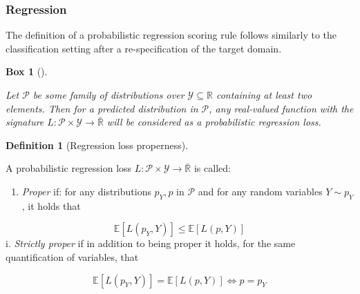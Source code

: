 \documentclass[
  letterpaper,
]{scrbook}
\providecommand{\tightlist}{%
  \setlength{\itemsep}{0pt}\setlength{\parskip}{0pt}}\usepackage{longtable,booktabs,array}
\theoremstyle{plain}
\newtheorem{conjecture}{Box}[chapter]
\theoremstyle{definition}
\newtheorem{definition}{Definition}[chapter]
\theoremstyle{remark}
\begin{document}
\hypertarget{sec-eval-distr-score-reg-reg}{%
\subsubsection{Regression}\label{sec-eval-distr-score-reg-reg}}

The definition of a probabilistic regression scoring rule follows
similarly to the classification setting after a re-specification of the
target domain.

\begin{tcolorbox}[enhanced jigsaw, title={Probabilistic regression loss}, breakable, leftrule=.75mm, rightrule=.15mm, opacityback=0, coltitle=black, colback=white, toptitle=1mm, toprule=.15mm, bottomtitle=1mm, titlerule=0mm, arc=.35mm, bottomrule=.15mm, colbacktitle=quarto-callout-note-color!10!white, left=2mm, opacitybacktitle=0.6, colframe=quarto-callout-note-color-frame]

\leavevmode{}%
\begin{conjecture}[]\label{cnj-loss-regr}

Let \(\mathcal{P}\) be some family of distributions over
\(\mathcal{Y}\subseteq \mathbb{R}\) containing at least two elements.
Then for a predicted distribution in \(\mathcal{P}\), any real-valued
function with the signature
\(L: \mathcal{P}\times \mathcal{Y}\rightarrow \bar{\mathbb{R}}\) will be
considered as a \emph{probabilistic regression loss}.

\end{conjecture}

\end{tcolorbox}

\leavevmode{}%
\begin{definition}[Regression loss properness]\label{def-regr-proper}

A probabilistic regression loss
\(L: \mathcal{P}\times \mathcal{Y}\rightarrow \bar{\mathbb{R}}\) is
called:

\begin{enumerate}
\def\labelenumi{\roman{enumi}.}
\tightlist
\item
  \emph{Proper} if: for any distributions \(p_Y,p\) in \(\mathcal{P}\)
  and for any random variables \(Y \sim p_Y\), it holds that
\end{enumerate}

\[
\mathbb{E}[L(p_Y, Y)] \leq \mathbb{E}[L(p, Y)]
\] i. \emph{Strictly proper} if in addition to being proper it holds,
for the same quantification of variables, that

\[
\mathbb{E}[L(p_Y, Y)] = \mathbb{E}[L(p, Y)] \Leftrightarrow p = p_Y
\]

\end{definition}
\end{document}
